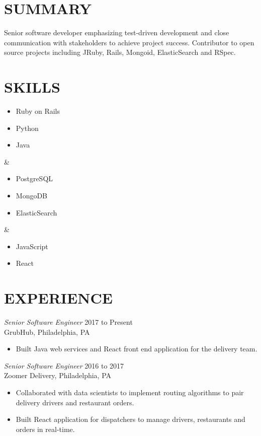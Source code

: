 \documentclass[line]{style}
\begin{document}
\newsectionwidth{0in}

\address{michaelcdalton@gmail.com / (267) 247-2541}
\address{github.com/kcdragon / linkedin.com/in/michaelcdalton}

\begin{resume}
\section{SUMMARY}
Senior software developer emphasizing test-driven development and close communication with stakeholders to achieve project success. Contributor to open source projects including JRuby, Rails, Mongoid, ElasticSearch and RSpec.

\section{SKILLS}
\begin{ncolumn}{3}
\begin{itemize} \itemsep -2pt
\item Ruby on Rails
\item Python
\item Java
\end{itemize}
&
\begin{itemize} \itemsep -2pt
\item PostgreSQL
\item MongoDB
\item ElasticSearch
\end{itemize}
&
\begin{itemize} \itemsep -2pt
\item JavaScript
\item React
\end{itemize}
\end{ncolumn}

\section{EXPERIENCE}

{\sl Senior Software Engineer} \hfill 2017 to Present \\
GrubHub, Philadelphia, PA
\begin{itemize} \itemsep -2pt
\item Built Java web services and React front end application for the delivery team.
\end{itemize}

{\sl Senior Software Engineer} \hfill 2016 to 2017 \\
Zoomer Delivery, Philadelphia, PA
\begin{itemize} \itemsep -2pt
\item Collaborated with data scientists to implement routing algorithms to pair delivery drivers and restaurant orders.
\item Built React application for dispatchers to manage drivers, restaurants and orders in real-time.
\end{itemize}


\end{resume}
\end{document}
